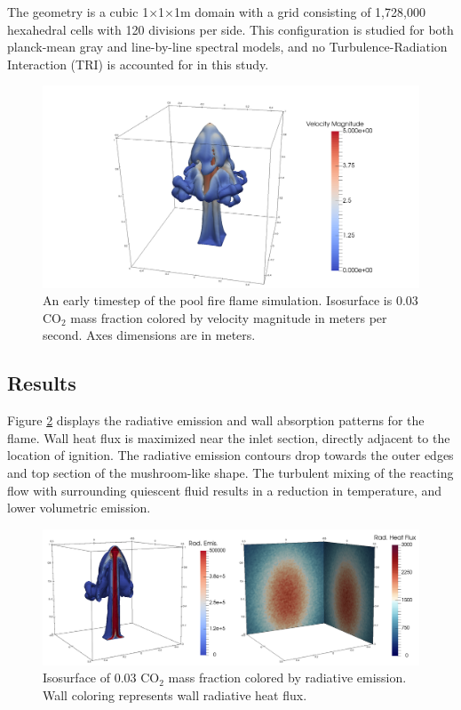 The geometry is a cubic 1$\times$1$\times$1m domain with a grid consisting of 1,728,000 hexahedral cells with 120 divisions per side.
This configuration is studied for both planck-mean gray and line-by-line spectral models, and no Turbulence-Radiation Interaction (TRI) is accounted for in this study.

\begin{figure}
\includegraphics[width=\linewidth]{figures/ch4/contour_early.png}
\caption{An early timestep of the pool fire flame simulation. Isosurface is 0.03 CO$_2$ mass fraction colored by velocity magnitude in meters per second. Axes dimensions are in meters.}
\label{fig:PoolFire_diagram}
\end{figure}

\subsection{Results}
Figure \ref{fig:PoolFire_radiationcontours} displays the radiative emission and wall absorption patterns for the flame. Wall heat flux is maximized near the inlet section, directly adjacent to the location of ignition. 
The radiative emission contours drop towards the outer edges and top section of the mushroom-like shape. The turbulent mixing of the reacting flow with surrounding quiescent fluid results in a reduction in temperature, and lower volumetric emission.  

\begin{figure}
\includegraphics[width=\linewidth]{figures/ch4/radiation_contours.png}
\caption{Isosurface of 0.03 CO$_2$ mass fraction colored by radiative emission. Wall coloring represents wall radiative heat flux.}
\label{fig:PoolFire_radiationcontours}
\end{figure}

